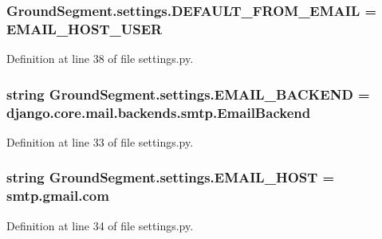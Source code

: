 \subsubsection[{D\+E\+F\+A\+U\+L\+T\+\_\+\+F\+R\+O\+M\+\_\+\+E\+M\+A\+I\+L}]{\setlength{\rightskip}{0pt plus 5cm}Ground\+Segment.\+settings.\+D\+E\+F\+A\+U\+L\+T\+\_\+\+F\+R\+O\+M\+\_\+\+E\+M\+A\+I\+L = {\bf E\+M\+A\+I\+L\+\_\+\+H\+O\+S\+T\+\_\+\+U\+S\+E\+R}}\label{namespace_ground_segment_1_1settings_ac016a8ca7717627c7aa8538920482b88}


Definition at line 38 of file settings.\+py.

\hypertarget{namespace_ground_segment_1_1settings_ada1dcaeb590c4106b8bd01b0bf16d8c7}{}
\subsubsection[{E\+M\+A\+I\+L\+\_\+\+B\+A\+C\+K\+E\+N\+D}]{\setlength{\rightskip}{0pt plus 5cm}string Ground\+Segment.\+settings.\+E\+M\+A\+I\+L\+\_\+\+B\+A\+C\+K\+E\+N\+D = \textquotesingle{}django.\+core.\+mail.\+backends.\+smtp.\+Email\+Backend\textquotesingle{}}\label{namespace_ground_segment_1_1settings_ada1dcaeb590c4106b8bd01b0bf16d8c7}


Definition at line 33 of file settings.\+py.

\hypertarget{namespace_ground_segment_1_1settings_a543f885a8ff97df8e4e3c215d0ef42a8}{}
\subsubsection[{E\+M\+A\+I\+L\+\_\+\+H\+O\+S\+T}]{\setlength{\rightskip}{0pt plus 5cm}string Ground\+Segment.\+settings.\+E\+M\+A\+I\+L\+\_\+\+H\+O\+S\+T = \textquotesingle{}smtp.\+gmail.\+com\textquotesingle{}}\label{namespace_ground_segment_1_1settings_a543f885a8ff97df8e4e3c215d0ef42a8}


Definition at line 34 of file settings.\+py.

\hypertarget{namespace_ground_segment_1_1settings_aedd7c143f3020b0a1156e678dc353726}{}
